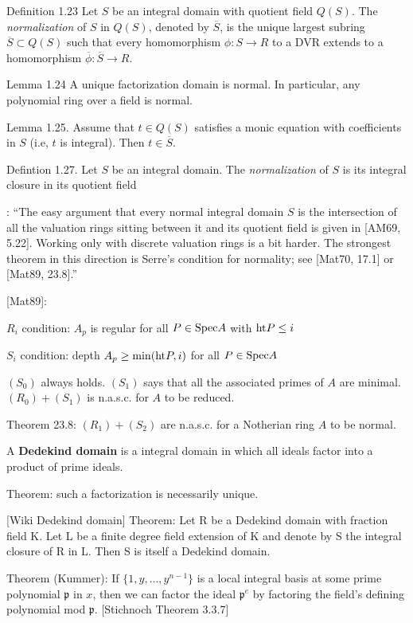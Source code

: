 \cite{kollar} Definition 1.23
Let $S$ be an integral domain with quotient field $Q(S)$.
The {\it normalization} of $S$ in $Q(S)$, denoted by $\overline{S}$,
is the unique largest subring $\overline{S} \subset Q(S)$
such that every homomorphism $\phi: S \to R$ to a DVR
extends to a homomorphism $\overline{\phi}: \overline{S} \to R$.

\cite{kollar} Lemma 1.24
A unique factorization domain is normal.  In particular,
any polynomial ring over a field is normal.

\cite{kollar} Lemma 1.25.
Assume that $t \in Q(S)$ satisfies a monic equation
with coefficients in $S$ (i.e, $t$ is integral).
Then $t \in \overline{S}$.

\cite{kollar} Defintion 1.27.
Let $S$ be an integral domain.  The {\it normalization} of $S$
is its integral closure in its quotient field

\cite{kollar}: ``The easy argument that every normal integral domain $S$
is the intersection of all the valuation rings sitting between
it and its quotient field is given in [AM69, 5.22].  Working
only with discrete valuation rings is a bit harder.  The strongest
theorem in this direction is Serre's condition for normality;
see [Mat70, 17.1] or [Mat89, 23.8].''

[Mat89]:

$R_i$ condition: $A_p$ is regular for all $P \in {\rm Spec } A$ with ${\rm ht } P \le i$

$S_i$ condition: depth $A_p \ge {\rm min}({\rm ht } P, i)$ for all $P \in {\rm Spec } A$

$(S_0)$ always holds. $(S_1)$ says that all the associated primes of $A$ are minimal.
$(R_0)+(S_1)$ is n.a.s.c. for $A$ to be reduced.

Theorem 23.8: $(R_1)+(S_2)$ are n.a.s.c. for a Notherian ring $A$ to be normal.

A {\bf Dedekind domain} is a integral domain in which all ideals factor into a product of prime ideals.

Theorem: such a factorization is necessarily unique.

[Wiki Dedekind domain] Theorem: Let R be a Dedekind domain with
fraction field K. Let L be a finite degree field extension of K and
denote by S the integral closure of R in L. Then S is itself a
Dedekind domain.

Theorem (Kummer): If $\{1,y,...,y^{n-1}\}$ is a local integral basis
at some prime polynomial $\mathfrak{p}$ in $x$, then we can factor
the ideal $\mathfrak{p}^e$ by factoring the field's defining
polynomial mod $\mathfrak{p}$. [Stichnoch Theorem 3.3.7]

